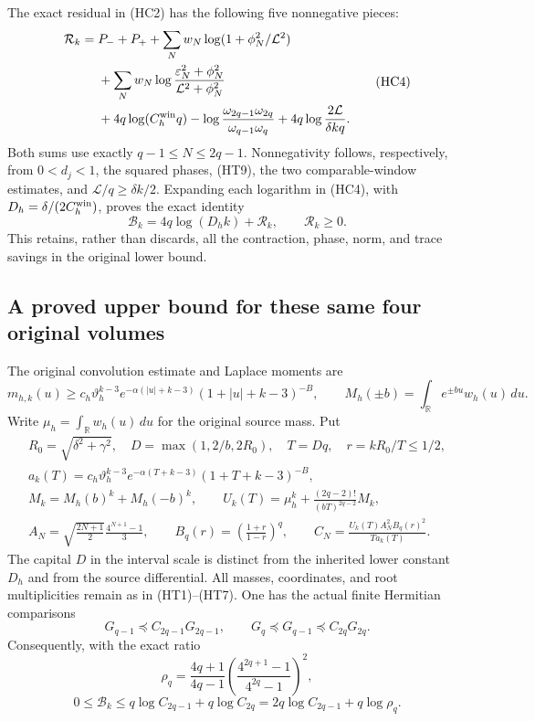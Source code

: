 The exact residual in (HC2) has the following five nonnegative pieces:
\[
 \begin{split}
 \mathcal R_k={}&P_-+P_+
 +\sum_Nw_N\log(1+\phi_N^2/\mathcal L^2)\\
 &+\sum_Nw_N\log\frac{\varepsilon_N^2+\phi_N^2}
                              {\mathcal L^2+\phi_N^2}\\
 &+4q\log(C_h^{\rm win}q)
       -\log\frac{\omega_{2q-1}\omega_{2q}}{\omega_{q-1}\omega_q}
 +4q\log\frac{2\mathcal L}{\delta kq}.
 \end{split}\tag{HC4}
\]
Both sums use exactly $q-1\leq N\leq2q-1$.  Nonnegativity follows,
respectively, from $0<d_j<1$, the squared phases, (HT9), the two
comparable-window estimates, and $\mathcal L/q\geq\delta k/2$.
Expanding each logarithm in (HC4), with $D_h=\delta/(2C_h^{\rm win})$,
proves the exact identity
\[
 \boxed{\mathcal B_k=4q\log(D_hk)+\mathcal R_k,
 \qquad\mathcal R_k\geq0.}\tag{HC5}
\]
This retains, rather than discards, all the contraction, phase, norm,
and trace savings in the original lower bound.

\subsection{A proved upper bound for these same four original volumes}

The original convolution estimate and Laplace moments are
\[
 m_{h,k}(u)\geq c_h\vartheta_h^{k-3}
 e^{-\alpha(|u|+k-3)}(1+|u|+k-3)^{-B},\qquad
 M_h(\pm b)=\int_{\mathbb{R}}e^{\pm bu}w_h(u)\,du.
\]
Write $\mu_h=\int_{\mathbb{R}}w_h(u)\,du$ for the original source mass.
Put
\[
 \begin{gathered}
 R_0=\sqrt{\delta^2+\gamma^2},\quad
 D=\max(1,2/b,2R_0),\quad T=Dq,\quad r=kR_0/T\leq1/2,\\
 a_k(T)=c_h\vartheta_h^{k-3}e^{-\alpha(T+k-3)}
 (1+T+k-3)^{-B},\\
 M_k=M_h(b)^k+M_h(-b)^k,\qquad
 U_k(T)=\mu_h^k+\frac{(2q-2)!}{(bT)^{2q-2}}M_k,\\
 A_N=\sqrt{\frac{2N+1}{2}}\frac{4^{N+1}-1}{3},\qquad
 B_q(r)=\left(\frac{1+r}{1-r}\right)^q,\qquad
 C_N=\frac{U_k(T)A_N^2B_q(r)^2}{T a_k(T)}.
 \end{gathered}\tag{HC6}
\]
The capital $D$ in the interval scale is distinct from the inherited
lower constant $D_h$ and from the source differential.  All masses,
coordinates, and root multiplicities remain as in (HT1)--(HT7).
One has the actual finite Hermitian comparisons
\[
 G_{q-1}\preceq C_{2q-1}G_{2q-1},\qquad
 G_q\preceq G_{q-1}\preceq C_{2q}G_{2q}.
\]
Consequently, with the exact ratio
\[
 \rho_q=\frac{4q+1}{4q-1}
 \left(\frac{4^{2q+1}-1}{4^{2q}-1}\right)^2,
\]
\[
 \boxed{0\leq\mathcal B_k
 \leq q\log C_{2q-1}+q\log C_{2q}
 =2q\log C_{2q-1}+q\log\rho_q.}\tag{HC7}
\]


